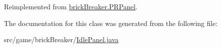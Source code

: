 Reimplemented from \hyperlink{classbrick_breaker_1_1_p_r_panel_ad077fab978f84663f366a6fdde5efe6c}{brickBreaker.PRPanel}.



The documentation for this class was generated from the following file:\begin{DoxyCompactItemize}
\item 
src/game/brickBreaker/\hyperlink{_idle_panel_8java}{IdlePanel.java}\end{DoxyCompactItemize}
